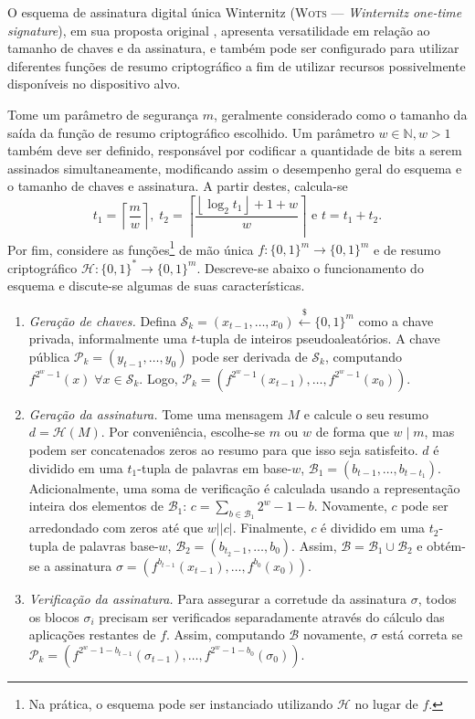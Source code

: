 \documentclass{article}
\newcommand{\hh}{$\mathcal{H}$}
\newcommand{\pk}{$\mathcal{P}_k$}
\newcommand{\sk}{$\mathcal{S}_k$}
\newcommand{\binwds}[1]{\{0, 1\}^{#1}}
\newcommand{\length}[1]{\vert #1 \vert}
\begin{document}
O esquema de assinatura digital única Winternitz (\textsc{Wots} --- \emph{Winternitz one-time signature}), em sua proposta original \cite{Merkle:1989:CDS:118209.118230},
apresenta versatilidade em relação ao tamanho de chaves e da assinatura, e também pode
ser configurado para utilizar diferentes funções de resumo criptográfico a fim de
utilizar recursos possivelmente disponíveis no dispositivo alvo.

Tome um parâmetro de segurança $m$, geralmente considerado como
o tamanho da saída da função de resumo criptográfico escolhido. Um parâmetro
$w \in \mathbb{N}, w > 1$ também deve ser definido, responsável por codificar a
quantidade de bits a serem assinados simultaneamente, modificando assim o
desempenho geral do esquema e o tamanho de chaves e assinatura. A partir destes,
calcula-se
    $$t_1 = \left\lceil \frac{m}{w} \right\rceil, \; t_2 = \left\lceil 
    \frac{\left\lfloor \log_2 t_1 \right\rfloor + 1 + w}{w} \right\rceil \text{ e }
    t = t_1 + t_2.$$
Por fim, considere as funções\footnote{Na prática, o esquema pode ser instanciado utilizando \hh{} no lugar de $f$.} de mão única
$f : \binwds{m} \longrightarrow \binwds{m}$
e de resumo criptográfico
$\mathcal{H} : \binwds{*} \longrightarrow \binwds{m}$.
Descreve-se abaixo o funcionamento do esquema
e discute-se algumas de suas características. 

\begin{enumerate}
    \item[] \emph{Geração de chaves.} Defina $\text{\sk{}} = (x_{t-1}, \dots, x_0) \stackrel{\$}{\longleftarrow} \binwds{m}$ como a chave privada, informalmente uma $t$-tupla de inteiros pseudoaleatórios. A chave pública $\text{\pk{}} = (y_{t-1}, \dots, y_0)$ pode ser derivada de \sk{}, computando $f^{2^{w}-1}(x) \; \forall x \in  \text{\sk{}}$. Logo, $\text{\pk{}} = (f^{2^{w}-1}(x_{t-1}), \dots, f^{2^{w}-1}(x_0))$.

    \item[] \emph{Geração da assinatura.} Tome uma mensagem $M$ e calcule o seu resumo $d = \mathcal{H}(M)$. Por conveniência, escolhe-se $m$ ou $w$ de forma que $w \mid m$, mas podem ser concatenados zeros ao resumo para que isso seja satisfeito. $d$ é dividido em uma $t_1$-tupla de palavras em base-$w$, $\mathcal{B}_1 = (b_{t-1}, \dots, b_{t-t_1})$. 
    Adicionalmente, uma soma de verificação é calculada usando a representação inteira dos elementos de $\mathcal{B}_1$: $c = \sum_{b \in \mathcal{B}_1} 2^w - 1 - b$. Novamente, $c$ pode ser arredondado com zeros até que $w \mid \length{c}$. Finalmente, $c$ é dividido em uma $t_2$-tupla de palavras base-$w$, $\mathcal{B}_2 = (b_{t_2-1}, \dots, b_0)$. Assim, $\mathcal{B} = \mathcal{B}_1 \cup \mathcal{B}_2$ e obtém-se a assinatura $\sigma = (f^{b_{t-1}}(x_{t-1}), \dots, f^{b_0}(x_0)).$
    
    \item[] \emph{Verificação da assinatura.} Para assegurar a corretude da assinatura $\sigma$, todos os blocos $\sigma_i$ precisam ser verificados separadamente através do cálculo das aplicações restantes de $f$. Assim, computando $\mathcal{B}$ novamente, $\sigma$ está correta se $\text{\pk{}} = (f^{2^w - 1 - b_{t-1}}(\sigma_{t-1}), \dots, f^{2^w - 1 - b_0}(\sigma_0))$.
\end{enumerate}
\end{document}

